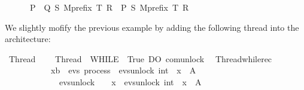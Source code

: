 \begin{isabellebody}
\ \ \ \ \ {\isasymLongrightarrow}\ {\isacharparenleft}{\kern0pt}{\isacharparenleft}{\kern0pt}P\ {\isacharbar}{\kern0pt}{\isacharbar}{\kern0pt}{\isacharbar}{\kern0pt}\ Q{\isacharparenright}{\kern0pt}\ {\isasymlbrakk}S{\isasymrbrakk}\ {\isacharparenleft}{\kern0pt}Mprefix\ T\ R{\isacharparenright}{\kern0pt}{\isacharparenright}{\kern0pt}\ {\isacharequal}{\kern0pt}\ P\ {\isasymlbrakk}S{\isasymrbrakk}\ {\isacharparenleft}{\kern0pt}Mprefix\ T\ R{\isacharparenright}{\kern0pt}{\isacartoucheclose}%
\isadelimdocument
%
\endisadelimdocument
%
\isatagdocument
%
\isamarkuptrue%
%
\endisatagdocument
{\isafolddocument}%
%
\isadelimdocument
%
\endisadelimdocument
%
\begin{isamarkuptext}%
We slightly mofify the previous example by adding the following thread into the
architecture:%
\end{isamarkuptext}\isamarkuptrue%
\isamarkupfalse%
\ Thread{}\ \ \isanewline
\ \ {\isachardoublequoteopen}Thread{}\ {\isacharequal}{\kern0pt}\ WHILE\ {\isacharparenleft}{\kern0pt}{\isasymlambda}{\isasymsigma}{\isachardot}{\kern0pt}\ True{\isacharparenright}{\kern0pt}\ DO\ {\isacharparenleft}{\kern0pt}com{\isachardot}{\kern0pt}unlock\ {}{\isacharparenright}{\kern0pt}{\isachardoublequoteclose}\isanewline
\isanewline
{}\isamarkupfalse%
\ Thread{}{\isacharunderscore}{\kern0pt}while{\isacharunderscore}{\kern0pt}rec\ {\isacharcolon}{\kern0pt}\ \isanewline
\ \ \ \ \ \ \ \ \ \ {\isachardoublequoteopen}{\isacharparenleft}{\kern0pt}{\isasymmu}\ x{\isacharcolon}{\kern0pt}{\isacharcolon}{\kern0pt}{\isacharprime}{\kern0pt}b\ {\isasymRightarrow}\ evs\ process{\isachardot}{\kern0pt}\ {\isacharparenleft}{\kern0pt}{\isasymlambda}{\isasymsigma}{\isachardot}{\kern0pt}\ evs{\isachardot}{\kern0pt}unlock\ {\isacharparenleft}{\kern0pt}{}{\isacharcolon}{\kern0pt}{\isacharcolon}{\kern0pt}int{\isacharparenright}{\kern0pt}\ {\isasymrightarrow}\ x\ {\isasymsigma}{\isacharparenright}{\kern0pt}{\isacharparenright}{\kern0pt}\ A\ \isanewline
\ \ \ \ \ \ \ \ \ \ \ \ {\isacharequal}{\kern0pt}\ evs{\isachardot}{\kern0pt}unlock\ {}\ {\isasymrightarrow}\ {\isacharparenleft}{\kern0pt}{\isasymmu}\ x{\isachardot}{\kern0pt}\ {\isacharparenleft}{\kern0pt}{\isasymlambda}{\isasymsigma}{\isachardot}{\kern0pt}\ evs{\isachardot}{\kern0pt}unlock\ {\isacharparenleft}{\kern0pt}{}{\isacharcolon}{\kern0pt}{\isacharcolon}{\kern0pt}int{\isacharparenright}{\kern0pt}\ {\isasymrightarrow}\ x\ {\isasymsigma}{\isacharparenright}{\kern0pt}{\isacharparenright}{\kern0pt}\ A{\isachardoublequoteclose}\isanewline

\end{isabellebody}
